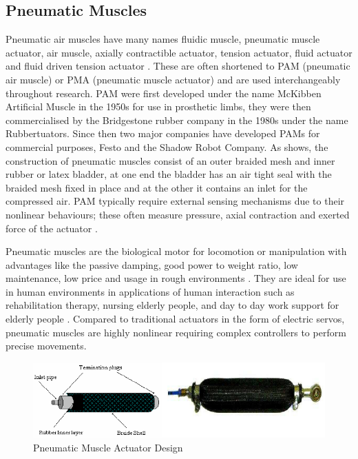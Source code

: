 \documentclass[11pt,a4paper]{article}
\begin{document}
\subsection{Pneumatic Muscles}
\label{sub:pneumatic_muscles}
Pneumatic air muscles have many names fluidic muscle, pneumatic muscle actuator, air muscle, axially contractible actuator, tension actuator, fluid actuator and fluid driven tension actuator \cite{najmuddin_mustaffa_2017} \cite{lau_chai_2012}. These are often shortened to PAM (pneumatic air muscle) or PMA (pneumatic muscle actuator) and are used interchangeably throughout research. PAM were first developed under the name McKibben Artificial Muscle in the 1950s for use in prosthetic limbs, they were then commercialised by the Bridgestone rubber company in the 1980s under the name Rubbertuators. Since then two major companies have developed PAMs for commercial purposes, Festo and the Shadow Robot Company. As  shows, the construction of pneumatic muscles consist of an outer braided mesh and inner rubber or latex bladder, at one end the bladder has an air tight seal with the braided mesh fixed in place and at the other it contains an inlet for the compressed air. PAM typically require external sensing mechanisms due to their nonlinear behaviours; these often measure pressure, axial contraction and exerted force of the actuator \cite{erin_pol_valle_park_2016}. \newline

Pneumatic muscles are the biological motor for locomotion or manipulation with advantages like the passive damping, good power to weight ratio, low maintenance, low price and usage in rough environments \cite{ranjan_upadhyay_kumar_dhyani_2012}. They are ideal for use in human environments in applications of human interaction such as rehabilitation therapy, nursing elderly people, and day to day work support for elderly people \cite{saga_nagase_saikawa_2006}. Compared to traditional actuators in the form of electric servos, pneumatic muscles are highly nonlinear requiring complex controllers to perform precise movements. \newline

\begin{figure}[ht!]
    \centering
    \includegraphics[scale=0.6]{Pneumatic-Muscle-Actuator-Design.png}
    \caption{Pneumatic Muscle Actuator Design \cite{pneumatic_image}}
    \label{fig:pneumatic_design}
\end{figure}
\end{document}
